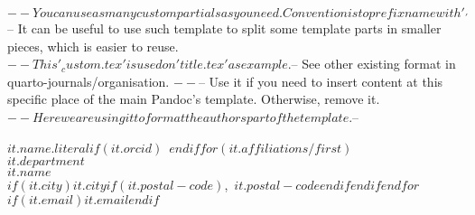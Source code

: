 $-- You can use as many custom partials as you need. Convention is to prefix name with '_'
$-- It can be useful to use such template to split some template parts in smaller pieces, which is easier to reuse.
$-- This '_custom.tex' is used on 'title.tex' as example.
$-- See other existing format in quarto-journals/organisation.
$-- %
$-- Use it if you need to insert content at this specific place of the main Pandoc's template. Otherwise, remove it.
$-- Here we are using it to format the authors part of the template.
$-- %

\textbf{$it.name.literal$}$if(it.orcid)$~$endif$$for(it.affiliations/first)$\\$it.department$\\$it.name$\\$if(it.city)$$it.city$$if(it.postal-code)$,\ $it.postal-code$$endif$$endif$$endfor$\\$if(it.email)$\href{mailto:$it.email$}{$it.email$}$endif$
